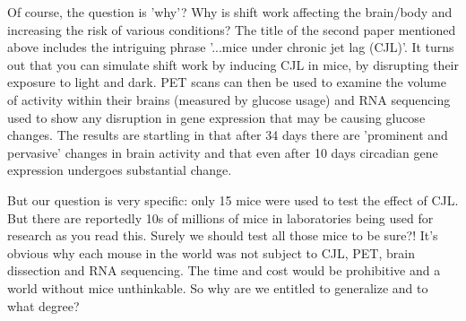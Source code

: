 \documentclass[a4paper,twosided,notoc]{tufte-book}
\begin{document}
Of course, the question is 'why'? Why is shift work affecting the brain/body and increasing the risk of various conditions? The title of the second paper mentioned above includes the intriguing phrase '...mice under chronic jet lag (CJL)'. It turns out that you can simulate shift work by inducing CJL in mice, by disrupting their exposure to light and dark. PET scans can then be used to examine the volume of activity within their brains (measured by glucose usage) and RNA sequencing used to show any disruption in gene expression that may be causing glucose changes. The results are startling in that after 34 days there are 'prominent and pervasive' changes in brain activity and that even after 10 days circadian gene expression  undergoes substantial change. 

But our question is very specific: only 15 mice were used to test the effect of CJL. But there are reportedly 10s of millions  of mice in laboratories being used for research as you read this. Surely we should test all those mice to be sure?! It's obvious why each mouse in the world was not subject to CJL, PET, brain dissection and RNA sequencing. The time and cost would be prohibitive and a world without mice unthinkable. So why are we entitled to generalize and to what degree?
\end{document}
